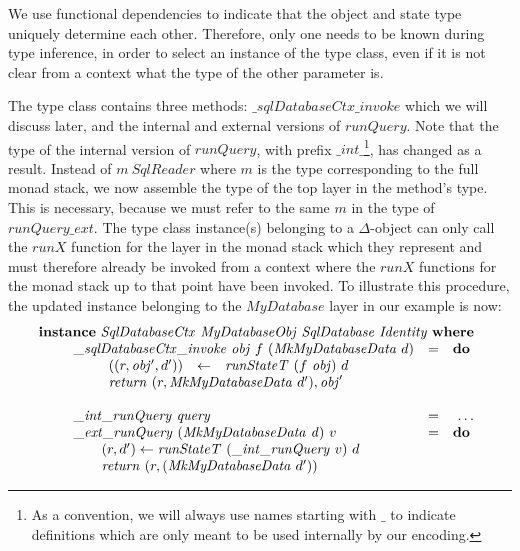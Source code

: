 We use functional dependencies\cite{jones2000type} to indicate that the object and state type uniquely determine each other. Therefore, only one needs to be known during type inference, in order to select an instance of the type class, even if it is not clear from a context what the type of the other parameter is.

The type class contains three methods: $\mathit{\_sqlDatabaseCtx\_invoke}$ which we will discuss later, and the internal and external versions of $\mathit{runQuery}$. Note that the type of the internal version of $\mathit{runQuery}$, with prefix $\_\mathit{int}\_$\footnote{As a convention, we will always use names starting with $\_$ to indicate definitions which are only meant to be used internally by our encoding.}, has changed as a result. Instead of $m~\mathit{SqlReader}$ where $m$ is the type corresponding to the full monad stack, we now assemble the type of the top layer in the method's type. This is necessary, because we must refer to the same $m$ in the type of $\mathit{runQuery\_ext}$. The type class instance(s) belonging to a $\Delta$-object can only call the $\mathit{runX}$ function for the layer in the monad stack which they represent and must therefore already be invoked from a context where the $\mathit{runX}$ functions for the monad stack up to that point have been invoked. To illustrate this procedure, the updated instance belonging to the $\mathit{MyDatabase}$ layer in our example is now:
\begin{displaymath}
\begin{array}{l}
\mathbf{instance}~\mathit{SqlDatabaseCtx}~\mathit{MyDatabaseObj}~\mathit{SqlDatabase}~\mathit{Identity}~\mathbf{where}\\
\qquad \begin{array}{lcl}
\mathit{\_\mathit{sqlDatabaseCtx\_invoke}}~\mathit{obj}~f~(\mathit{MkMyDatabaseData}~d) & = & \mathbf{do}\\
\multicolumn{3}{l}{\qquad \begin{array}{lcl}
((r, \mathit{obj'}, d')) & \leftarrow & \mathit{runStateT}~(f~\mathit{obj})~d \\
\multicolumn{3}{l}{\mathit{return}~(r, \mathit{MkMyDatabaseData}~d'), \mathit{obj}'}
\end{array}}
\\\\
\mathit{\_int\_runQuery}~\mathit{query} & = & ~\ldots \\
\mathit{\_ext\_runQuery}~(\mathit{MkMyDatabaseData}~\mathit{d})~v & = & \mathbf{do} \\
\multicolumn{3}{l}{\qquad (r,d') \leftarrow \mathit{runStateT}~(\mathit{\_int\_runQuery}~v)~d } \\ 
\multicolumn{3}{l}{\qquad \mathit{return}~(r, (\mathit{MkMyDatabaseData}~d')) } 
\end{array}
\end{array}
\end{displaymath}
